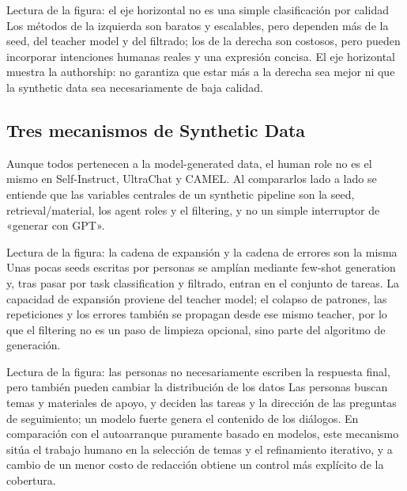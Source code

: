 \begin{knowledgebox}{Lectura de la figura: el eje horizontal no es una simple clasificación por calidad}
Los métodos de la izquierda son baratos y escalables, pero dependen más de la seed, del teacher model y del filtrado; los de la derecha son costosos, pero pueden incorporar intenciones humanas reales y una expresión concisa. El eje horizontal muestra la authorship: no garantiza que estar más a la derecha sea mejor ni que la synthetic data sea necesariamente de baja calidad.
\end{knowledgebox}


\subsection{Tres mecanismos de Synthetic Data}

Aunque todos pertenecen a la model-generated data, el human role no es el mismo en Self-Instruct, UltraChat y CAMEL. Al compararlos lado a lado se entiende que las variables centrales de un synthetic pipeline son la seed, retrieval/material, los agent roles y el filtering, y no un simple interruptor de «generar con GPT».


\begin{knowledgebox}{Lectura de la figura: la cadena de expansión y la cadena de errores son la misma}
Unas pocas seeds escritas por personas se amplían mediante few-shot generation y, tras pasar por task classification y filtrado, entran en el conjunto de tareas. La capacidad de expansión proviene del teacher model; el colapso de patrones, las repeticiones y los errores también se propagan desde ese mismo teacher, por lo que el filtering no es un paso de limpieza opcional, sino parte del algoritmo de generación.
\end{knowledgebox}


\begin{knowledgebox}{Lectura de la figura: las personas no necesariamente escriben la respuesta final, pero también pueden cambiar la distribución de los datos}
Las personas buscan temas y materiales de apoyo, y deciden las tareas y la dirección de las preguntas de seguimiento; un modelo fuerte genera el contenido de los diálogos. En comparación con el autoarranque puramente basado en modelos, este mecanismo sitúa el trabajo humano en la selección de temas y el refinamiento iterativo, y a cambio de un menor costo de redacción obtiene un control más explícito de la cobertura.
\end{knowledgebox}

